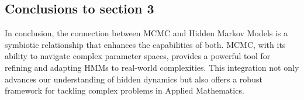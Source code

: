 \documentclass{englishreport}
\begin{document}
\newpage
\subsection{Conclusions to section 3}

In conclusion, the connection between MCMC and Hidden Markov Models is a symbiotic relationship that enhances the capabilities of both. MCMC, with its ability to navigate complex parameter spaces, provides a powerful tool for refining and adapting HMMs to real-world complexities. This integration not only advances our understanding of hidden dynamics but also offers a robust framework for tackling complex problems in Applied Mathematics.

\newpage
\printbibliography %
\end{document}
